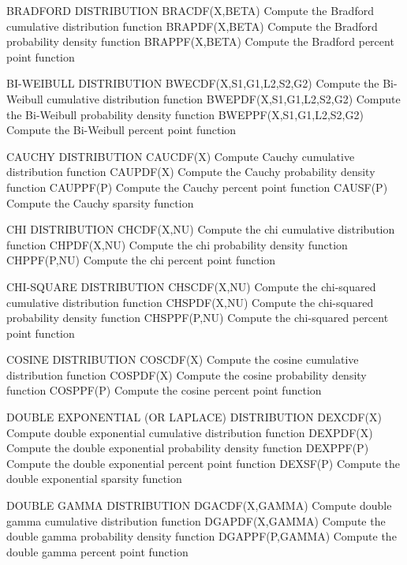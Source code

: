 BRADFORD DISTRIBUTION
   BRACDF(X,BETA)     Compute the Bradford cumulative distribution
                      function
   BRAPDF(X,BETA)     Compute the Bradford probability density function
   BRAPPF(X,BETA)     Compute the Bradford percent point function

BI-WEIBULL DISTRIBUTION
   BWECDF(X,S1,G1,L2,S2,G2) Compute the Bi-Weibull cumulative
                            distribution function
   BWEPDF(X,S1,G1,L2,S2,G2) Compute the Bi-Weibull probability density
                            function
   BWEPPF(X,S1,G1,L2,S2,G2) Compute the Bi-Weibull percent point
                            function

CAUCHY DISTRIBUTION
   CAUCDF(X)          Compute Cauchy cumulative distribution function
   CAUPDF(X)          Compute the Cauchy probability density function
   CAUPPF(P)          Compute the Cauchy percent point function
   CAUSF(P)           Compute the Cauchy sparsity function
 
CHI DISTRIBUTION
   CHCDF(X,NU)        Compute the chi cumulative distribution
                      function
   CHPDF(X,NU)        Compute the chi probability density function
   CHPPF(P,NU)        Compute the chi percent point function
 
CHI-SQUARE DISTRIBUTION
   CHSCDF(X,NU)       Compute the chi-squared cumulative distribution
                      function
   CHSPDF(X,NU)       Compute the chi-squared probability density
                      function
   CHSPPF(P,NU)       Compute the chi-squared percent point function
 
COSINE DISTRIBUTION
   COSCDF(X)          Compute the cosine cumulative distribution
                      function
   COSPDF(X)          Compute the cosine probability density function
   COSPPF(P)          Compute the cosine percent point function
 
DOUBLE EXPONENTIAL (OR LAPLACE) DISTRIBUTION
   DEXCDF(X)          Compute double exponential cumulative
                      distribution function
   DEXPDF(X)          Compute the double exponential probability
                      density function
   DEXPPF(P)          Compute the double exponential percent point
                      function
   DEXSF(P)           Compute the double exponential sparsity function

DOUBLE GAMMA DISTRIBUTION
   DGACDF(X,GAMMA)    Compute double gamma cumulative distribution
                      function
   DGAPDF(X,GAMMA)    Compute the double gamma probability density
                      function
   DGAPPF(P,GAMMA)    Compute the double gamma percent point function

